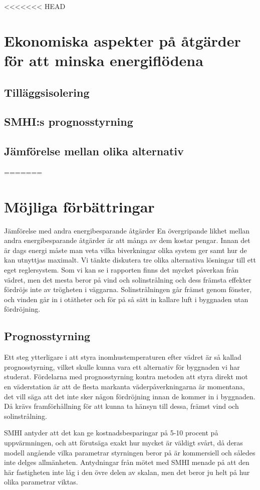 <<<<<<< HEAD
\section{Ekonomiska aspekter på åtgärder för att minska energiflödena}

\subsection{Tilläggsisolering}

\subsection{SMHI:s prognosstyrning}

\subsection{Jämförelse mellan olika alternativ}
=======
\section{Möjliga förbättringar}

Jämförelse med andra energibesparande åtgärder
En övergripande likhet mellan andra energibesparande åtgärder är att många av dem kostar pengar. Innan det är dags energi måste man veta vilka biverkningar olika system ger samt hur de kan utnyttjas maximalt.
Vi tänkte diskutera tre olika alternativa lösningar till ett eget reglersystem. 
Som vi kan se i rapporten finns det mycket påverkan från vädret, men det mesta beror på vind och solinstrålning och dess främsta effekter fördröjs inte av trögheten i väggarna. Solinstrålningen går främst genom fönster, och vinden går in i otätheter och för på så sätt in kallare luft i byggnaden utan fördröjning.
\subsection{Prognosstyrning}
Ett steg ytterligare i att styra inomhustemperaturen efter vädret är så kallad prognosstyrning, vilket skulle kunna vara ett alternativ för byggnaden vi har studerat.
Fördelarna med prognosstyrning kontra metoden att styra direkt mot en väderstation är att de flesta markanta väderpåverkningarna är momentana, det vill säga att det inte sker någon fördröjning innan de kommer in i byggnaden. Då krävs framförhållning för att kunna ta hänsyn till dessa, främst vind och solinstrålning.

SMHI antyder att det kan ge kostnadsbesparingar på 5-10 procent på uppvärmningen, och att förutsäga exakt hur mycket är väldigt svårt, då deras modell angående vilka parametrar styrningen beror på är kommersiell och således inte delges allmänheten.  Antydningar från mötet med SMHI menade på att den här fastigheten inte låg i den övre delen av skalan, men det beror ju helt på hur olika parametrar viktas.

